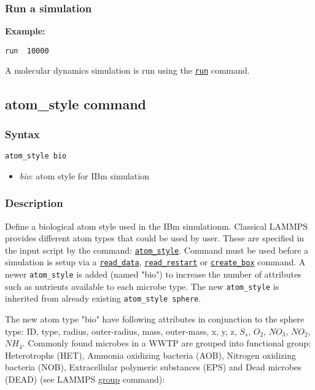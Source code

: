\documentclass[11pt,a4paper,openright]{article}
\begin{document}
\subsubsection{Run a simulation}
\textbf{Example:}
\begin{Verbatim}[frame=single]
   run  10000
\end{Verbatim}

A molecular dynamics simulation is run using the 
\href{http://lammps.sandia.gov/doc/run.html}{\tt run}
 command. 

\subsection{atom\_style command}
\label{atomstyle}
\subsubsection*{Syntax}

\begin{Verbatim}[frame=single]
   atom_style bio
\end{Verbatim}

\begin{itemize}
\item
	{\it bio}: atom style for IBm simulation
\end{itemize}

\subsubsection*{Description}

Define a biological atom style used in the IBm simulationm. Classical LAMMPS provides different atom types that could be used by user. These are specified in the input script by the command: \href{http://lammps.sandia.gov/doc/atom_style.html}{\tt atom\_style}. Command must be used before a simulation is setup via a \href{http://lammps.sandia.gov/doc/read_data.html}{\tt read\_data}, \href{http://lammps.sandia.gov/doc/read_restart.html}{\tt read\_restart} or \href{http://lammps.sandia.gov/doc/create_box.html}{\tt create\_box} command. A newer {\tt atom\_style} is added (named "bio") to increase the number of attributes such as nutrients available to each microbe type. The new {\tt atom\_style} is inherited from already existing 
{\tt atom\_style sphere}. 

The new atom type "bio" have following attributes in conjunction to the sphere type: ID, type, radius, outer-radius, mass, outer-mass, x, y, z, $S_s$, $O_2$, $NO_3$, $NO_2$, $NH_4$. Commonly found microbes in a WWTP are grouped into functional group:
Heterotrophs (HET), Ammonia oxidizing bacteria (AOB), Nitrogen oxidizing bacteria (NOB), Extracellular polymeric substances (EPS) and Dead microbes (DEAD) (see LAMMPS \href{http://lammps.sandia.gov/doc/group.html}{group} command):
\end{document}

